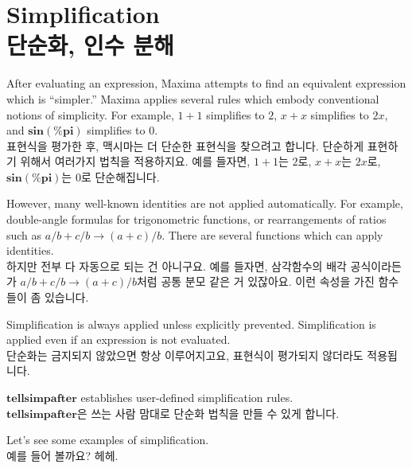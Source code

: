 \documentclass[12pt]{article}
\begin{document}
\section{Simplification \\ 단순화, 인수 분해}

After evaluating an expression,
Maxima attempts to find an equivalent expression which is ``simpler.''
Maxima applies several rules which embody conventional notions of simplicity.
For example,
$1 + 1$ simplifies to $2$, 
$x + x$ simplifies to $2 x$,
and $\mathbf{sin}(\mathbf{\%pi})$ simplifies to $0$. \\

표현식을 평가한 후, 맥시마는 더 단순한 표현식을 찾으려고 합니다.
단순하게 표현하기 위해서 여러가지 법칙을 적용하지요. 예를 들자면,
$1 + 1$는 $2$로, $x + x$는 $2 x$로, $\mathbf{sin}(\mathbf{\%pi})$는 $0$로 단순해집니다.

However,
many well-known identities are not applied automatically.
For example,
double-angle formulas for trigonometric functions,
or rearrangements of ratios such as $a/b + c/b \rightarrow (a + c)/b$.
There are several functions which can apply identities. \\

하지만 전부 다 자동으로 되는 건 아니구요. 예를 들자면, 삼각함수의 배각 공식이라든가 $a/b + c/b \rightarrow (a + c)/b$처럼 공통 분모 같은 거 있잖아요. 이런 속성을 가진 함수들이 좀 있습니다.



Simplification is always applied unless explicitly prevented.
Simplification is applied even if an expression is not evaluated. \\

단순화는 금지되지 않았으면 항상 이루어지고요, 표현식이 평가되지 않더라도 적용됩니다.

$\mathbf{tellsimpafter}$ establishes user-defined simplification rules. \\
$\mathbf{tellsimpafter}$은 쓰는 사람 맘대로 단순화 법칙을 만들 수 있게 합니다.

Let's see some examples of simplification. \\
예를 들어 볼까요? 헤헤.
\end{document}
